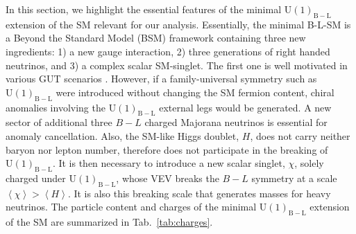 \documentclass[a4paper,11pt]{article}
\renewcommand{\(}{\left(}
\renewcommand{\)}{\right)}
\renewcommand{\[}{\left[}
\renewcommand{\]}{\right]}
\newcommand{\U}[1]{\mathrm{U}(1)_{\mathrm{#1}}}			%
\newcommand{\mean}[1]{\left \langle #1 \right \rangle }
\begin{document}
In this section, we highlight the essential features of the minimal $\U{B-L}$ extension of the SM relevant for our analysis. Essentially, the minimal B-L-SM is a Beyond the Standard Model (BSM) framework containing three new ingredients: 1) a new gauge interaction, 2) three generations of right handed neutrinos, and 3) a complex scalar SM-singlet. The first one is well motivated in various GUT scenarios \cite{Chanowitz:1977ye,Fritzsch:1974nn,Georgi:1978fu,Georgi:1979dq,Georgi:1979ga,Achiman:1978vg,Gursey:1975ki,Gursey:1981kf}. However, if a family-universal symmetry such as $\U{B-L}$ were introduced without changing the SM fermion content, chiral anomalies involving the $\U{B-L}$ external legs would be generated. A new sector of additional three $B-L$ charged Majorana neutrinos is essential for anomaly cancellation. Also, the SM-like Higgs doublet, $H$, does not carry neither baryon nor lepton number, therefore does not participate in the breaking of $\U{B-L}$. It is then necessary to introduce a new scalar singlet, $\chi$, solely charged under $\U{B-L}$, whose VEV breaks the $B-L$ symmetry at a scale $\mean{\chi} > \mean{H}$. It is also this breaking scale that generates masses for heavy neutrinos. The particle content and charges of the minimal $\U{B-L}$ extension of the SM are summarized in Tab.~\ref{tab:charges}.
%
\end{document}
